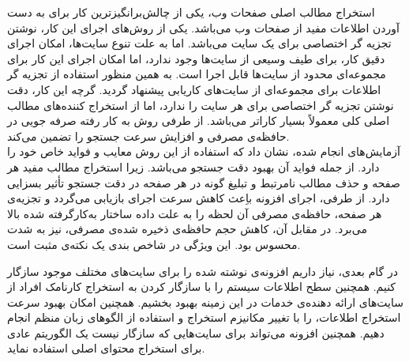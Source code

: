
استخراج مطالب اصلی صفحات وب، یکی از چالش‌برانگیز‌ترین کار برای به دست آوردن اطلاعات مفید از صفحات وب می‌باشد. یکی از روش‌های اجرای این کار، نوشتن تجزیه گر اختصاصی برای یک سایت می‌باشد. اما به علت تنوع سایت‌ها، امکان اجرای دقیق کار، برای طیف وسیعی از سایت‌ها وجود ندارد، اما امکان اجرای این کار برای مجموعه‌ای محدود از سایت‌ها قابل اجرا است. به همین منظور استفاده از تجزیه گر اطلاعات برای مجموعه‌ای از سایت‌های کاریابی پیشنهاد گردید. گرچه این کار، دقت نوشتن تجزیه گر اختصاصی برای هر سایت را ندارد، اما از استخراج کننده‌های مطالب اصلی کلی معمولاً بسیار کارا‌تر می‌باشد. از طرفی روش به کار رفته صرفه جویی در حافظه‌ی مصرفی و افزایش سرعت جستجو را تضمین می‌کند. 
\\
آزمایش‌های انجام شده، نشان داد که استفاده از این روش معایب و فواید خاص خود را دارد. از جمله فواید آن بهبود دقت جستجو می‌باشد. زیرا استخراج مطالب مفید هر صفحه و حذف مطالب نامرتبط و تبلیغ گونه در هر صفحه در دقت جستجو تأثیر بسزایی دارد. از طرفی، اجرای افزونه باِعث کاهش سرعت اجرای بازیابی می‌گردد و تجزیه‌ی هر صفحه، حافظه‌ی مصرفی آن لحظه را به علت داده ساختار به‌کارگرفته شده بالا می‌برد. در مقابل آن، کاهش حجم حافظه‌ی ذخیره شده‌ی مصرفی، نیز به شدت محسوس بود. این ویژگی در شاخص بندی یک نکته‌ی مثبت است. 

در گام بعدی، نیاز داریم افزونه‌ی نوشته شده را برای سایت‌های مختلف موجود سازگار کنیم. همچنین سطح اطلاعات سیستم را با سازگار کردن به استخراج کارنامک افراد از سایت‌های ارائه دهنده‌ی خدمات در این زمینه بهبود بخشیم. همچنین امکان بهبود سرعت استخراج اطلاعات، را با تغییر مکانیزم استخراج و استفاده از الگوهای زبان منظم انجام دهیم. همچنین افزونه می‌تواند برای سایت‌هایی که سازگار نیست یک الگوریتم عادی برای استخراج محتوای اصلی استفاده نماید.